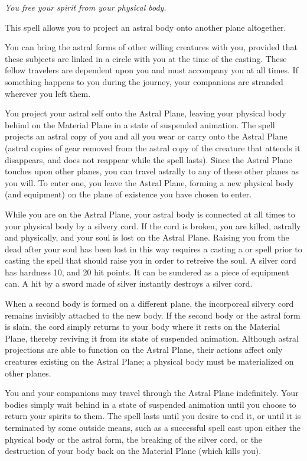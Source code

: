 \emph{You free your spirit from your physical body.}

This spell allows you to project an astral body onto another plane altogether.

You can bring the astral forms of other willing creatures with you, 
provided that these subjects are linked in a circle with you at the time of the casting. 
These fellow travelers are dependent upon you and must accompany you at all times. 
If something happens to you during the journey, your companions are stranded wherever you left them.

You project your astral self onto the Astral Plane, 
leaving your physical body behind on the Material Plane in a state of suspended animation. 
The spell projects an astral copy of you and all you wear or carry onto the Astral Plane
(astral copies of gear removed from the astral copy of the creature that attends it disappears, and does not reappear while the spell lasts). 
Since the Astral Plane touches upon other planes, you can travel astrally to any of these other planes as you will. 
To enter one, you leave the Astral Plane, forming a new physical body (and equipment) on the plane of existence you have chosen to enter.

While you are on the Astral Plane, your astral body is connected at all times to your physical body by a silvery cord. 
If the cord is broken, you are killed, astrally and physically, and your soul is lost on the Astral Plane. 
Raising you from the dead after your soul has been lost in this way requires a casting a  or  
spell prior to casting the spell that should raise you in order to retreive the soul.
A silver cord has hardness 10, and 20 hit points. 
It can be sundered as a piece of equipment can.
A hit by a sword made of silver instantly destroys a silver cord.

When a second body is formed on a different plane, the incorporeal silvery cord remains invisibly attached to the new body. 
If the second body or the astral form is slain, 
the cord simply returns to your body where it rests on the Material Plane, thereby reviving it from its state of suspended animation. 
Although astral projections are able to function on the Astral Plane, 
their actions affect only creatures existing on the Astral Plane; a physical body must be materialized on other planes.

You and your companions may travel through the Astral Plane indefinitely. 
Your bodies simply wait behind in a state of suspended animation until you choose to return your spirits to them. 
The spell lasts until you desire to end it, or until it is terminated by some outside means, 
such as a successful  spell cast upon either the physical body or the astral form, 
the breaking of the silver cord, or the destruction of your body back on the Material Plane (which kills you).

